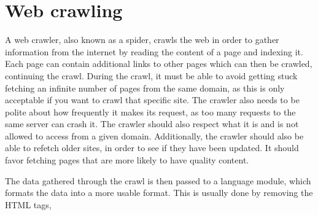 \section{Web crawling}


\citep[Ch.20]{manning2008introduction}


A web crawler, also known as a spider, crawls the web in order to gather
information from the internet by reading the content of a page and indexing it.
Each page can contain additional links to other pages which can then be
crawled, continuing the crawl. During the crawl, it must be able to avoid
getting stuck fetching an infinite number of pages from the same domain, as this
is only acceptable if you want to crawl that specific site. The crawler also
needs to be polite about how frequently it makes its request, as too many
requests to the same server can crash it. The crawler should also respect
what it is and is not allowed to access from a given domain.
Additionally, the crawler should also be able to refetch older sites, in order
to see if they have been updated. It should favor fetching pages that are more
likely to have quality content.\nl


The data gathered through the crawl is then passed to a language module, which
formats the data into a more usable format. This is usually done by removing
the HTML tags, 




